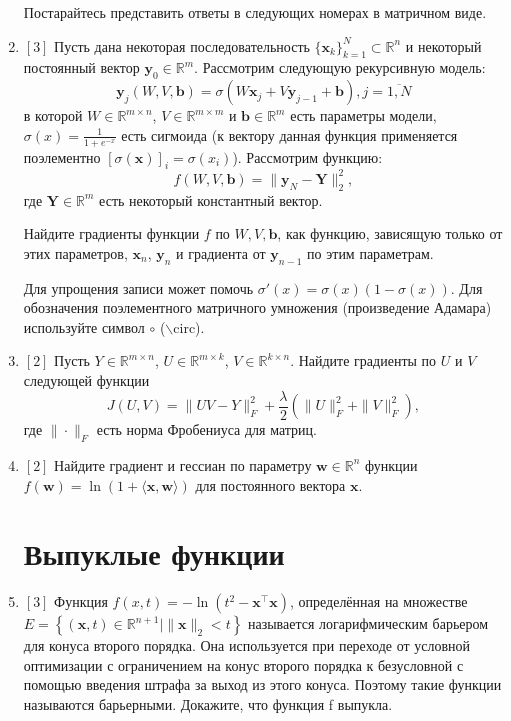 \documentclass{article}
\begin{document}
\begin{enumerate}
Постарайтесь представить ответы в следующих номерах в матричном виде.

    \item $[3]$ Пусть дана некоторая последовательность $\{\mathbf{x}_k\}_{k=1}^N \subset \mathbb{R}^n$ и некоторый постоянный вектор $\mathbf{y}_0\in \mathbb{R}^m$. Рассмотрим следующую рекурсивную модель:
    $$\textbf{y}_j(W, V, \mathbf{b}) = \sigma\left(W\mathbf{x}_j + V\mathbf{y}_{j-1} + \mathbf{b}\right), j=\overline{1,N}$$
    в которой $W\in \mathbb{R}^{m\times n}$, $V\in \mathbb{R}^{m\times m}$ и $\mathbf{b}\in \mathbb{R}^{m}$ есть параметры модели, $\sigma(x)=\frac{1}{1+e^{-x}}$ есть сигмоида (к вектору данная функция применяется поэлементно $[\sigma(\mathbf{x})]_i=\sigma(x_i)$). Рассмотрим функцию:
    $$f(W, V, \mathbf{b})=\|\mathbf{y}_N - \mathbf{Y}\|_2^2,$$
    где $\mathbf{Y}\in\mathbb{R}^m$ есть некоторый константный вектор.
    
    Найдите градиенты функции $f$ по $W, V, \mathbf{b}$, как функцию, зависящую только от этих параметров, $\mathbf{x}_n$, $\mathbf{y}_n$ и градиента от $\mathbf{y}_{n-1}$ по этим параметрам.
    
    Для упрощения записи может помочь $\sigma'(x) = \sigma(x)(1-\sigma(x))$. Для обозначения поэлементного матричного умножения (произведение Адамара) используйте символ $\circ$ ($\backslash$circ).
    
    \item $[2]$ Пусть $Y\in \mathbb{R}^{m\times n}$, $U\in \mathbb{R}^{m\times k}$, $V\in \mathbb{R}^{k\times n}$. Найдите градиенты по $U$ и $V$ следующей функции
    $$J(U, V) = \|UV - Y\|^2_F + \frac{\lambda}{2}\left(\|U\|^2_F + \|V\|^2_F\right),$$
    где $\|\cdot\|_F$ есть норма Фробениуса для матриц.
    
    \item $[2]$ Найдите градиент и гессиан по параметру $\textbf{w}\in\mathbb{R}^n$ функции $f(\mathbf{w}) = \ln\left(1+\langle\mathbf{x}, \mathbf{w}\rangle\right)$ для постоянного вектора $\mathbf{x}$.
    
\section{Выпуклые функции}
    
    \item $[3]$ Функция $f(x, t) = -\ln\left(t^2 - \textbf{x}^\top \textbf{x}\right)$,
    определённая на множестве $E = \left\{(\textbf{x}, t) \in \mathbb{R}^{n+1} \Big| \|\textbf{x}\|_2 < t\right\}$ называется логарифмическим барьером для конуса второго порядка. Она используется при переходе от условной оптимизации с ограничением на конус второго порядка к безусловной с помощью введения штрафа за выход из этого конуса. Поэтому такие функции называются барьерными. Докажите, что функция f выпукла.
    

\end{enumerate}
\end{document}
